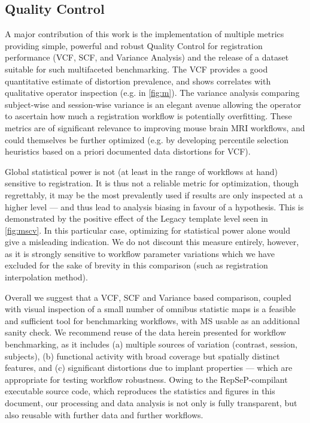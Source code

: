 \subsection{Quality Control}

A major contribution of this work is the implementation of multiple metrics providing simple, powerful and robust Quality Control for registration performance (VCF, SCF, and Variance Analysis) and the release of a dataset suitable for such multifaceted benchmarking.
The VCF provides a good quantitative estimate of distortion prevalence, and shows correlates with qualitative operator inspection (e.g. in \cref{fig:m}).
The variance analysis comparing subject-wise and session-wise variance is an elegant avenue allowing the operator to ascertain how much a registration workflow is potentially overfitting.
These metrics are of significant relevance to improving mouse brain MRI workflows, and could themselves be further optimized (e.g. by developing percentile selection heuristics based on a priori documented data distortions for VCF).

Global statistical power is not (at least in the range of workflows at hand) sensitive to registration.
It is thus not a reliable metric for optimization, though regrettably, it may be the most prevalently used if results are only inspected at a higher level --- and thus lead to analysis biasing in favour of a hypothesis.
This is demonstrated by the positive effect of the Legacy template level seen in \cref{fig:mscv}.
In this particular case, optimizing for statistical power alone would give a misleading indication.
We do not discount this measure entirely, however, as it is strongly sensitive to workflow parameter variations which we have excluded for the sake of brevity in this comparison (such as registration interpolation method).

Overall we suggest that a VCF, SCF and Variance based comparison, coupled with visual inspection of a small number of omnibus statistic maps is a feasible and sufficient tool for benchmarking workflows, with MS usable as an additional sanity check.
We recommend reuse of the data herein presented for workflow benchmarking, as it includes (a) multiple sources of variation (contrast, session, subjects), (b) functional activity with broad coverage but spatially distinct features, and (c) significant distortions due to implant properties --- which are appropriate for testing workflow robustness.
Owing to the RepSeP-compilant executable source code, which reproduces the statistics and figures in this document, our processing and data analysis is not only is fully transparent, but also reusable with further data and further workflows.

